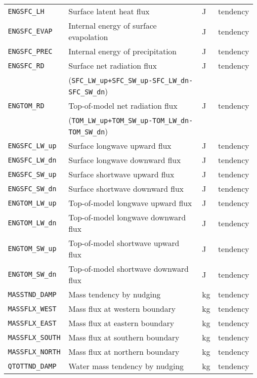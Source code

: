\begin{table}[h]
\begin{center}
\begin{tabularx}{150mm}{|l|X|l|l|}
      \verb|ENGSFC_LH|    & Surface latent   heat flux                & J & tendency \\
      \verb|ENGSFC_EVAP|  & Internal energy of surface evapolation    & J & tendency \\
      \verb|ENGSFC_PREC|  & Internal energy of precipitation          & J & tendency \\
      \verb|ENGSFC_RD|    & Surface net radiation flux                & J & tendency \\
                          & (\verb|SFC_LW_up+SFC_SW_up-SFC_LW_dn-SFC_SW_dn|) & & \\
      \verb|ENGTOM_RD|    & Top-of-model net radiation flux           & J & tendency \\
                          & (\verb|TOM_LW_up+TOM_SW_up-TOM_LW_dn-TOM_SW_dn|) & & \\
      \verb|ENGSFC_LW_up| & Surface longwave  upward   flux           & J & tendency \\
      \verb|ENGSFC_LW_dn| & Surface longwave  downward flux           & J & tendency \\
      \verb|ENGSFC_SW_up| & Surface shortwave upward   flux           & J & tendency \\
      \verb|ENGSFC_SW_dn| & Surface shortwave downward flux           & J & tendency \\
      \verb|ENGTOM_LW_up| & Top-of-model longwave  upward   flux      & J & tendency \\
      \verb|ENGTOM_LW_dn| & Top-of-model longwave  downward flux      & J & tendency \\
      \verb|ENGTOM_SW_up| & Top-of-model shortwave upward   flux      & J & tendency \\
      \verb|ENGTOM_SW_dn| & Top-of-model shortwave downward flux      & J & tendency \\
      \verb|MASSTND_DAMP|  & Mass tendency by nudging                 & kg & tendency \\
      \verb|MASSFLX_WEST|  & Mass flux at western  boundary           & kg & tendency \\
      \verb|MASSFLX_EAST|  & Mass flux at eastern  boundary           & kg & tendency \\
      \verb|MASSFLX_SOUTH| & Mass flux at southern boundary           & kg & tendency \\
      \verb|MASSFLX_NORTH| & Mass flux at northern boundary           & kg & tendency \\
      \verb|QTOTTND_DAMP|  & Water mass tendency by nudging           & kg & tendency \\

\end{tabularx}
\end{center}
\end{table}
